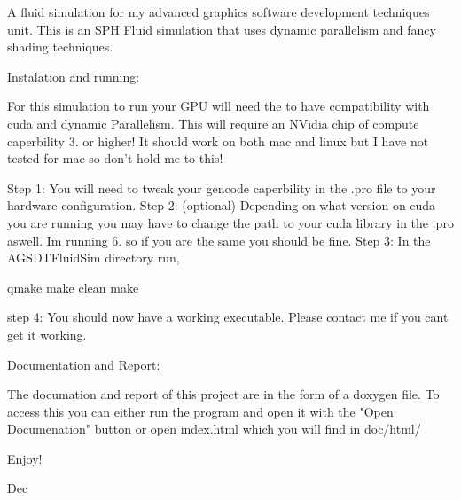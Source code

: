 A fluid simulation for my advanced graphics software development techniques unit. This is an S\-P\-H Fluid simulation that uses dynamic parallelism and fancy shading techniques.

Instalation and running\-:

For this simulation to run your G\-P\-U will need the to have compatibility with cuda and dynamic Parallelism. This will require an N\-Vidia chip of compute caperbility 3. or higher! It should work on both mac and linux but I have not tested for mac so don't hold me to this!

Step 1\-: You will need to tweak your gencode caperbility in the .pro file to your hardware configuration. Step 2\-: (optional) Depending on what version on cuda you are running you may have to change the path to your cuda library in the .pro aswell. Im running 6. so if you are the same you should be fine. Step 3\-: In the A\-G\-S\-D\-T\-Fluid\-Sim directory run, \begin{DoxyVerb}qmake
make clean
make
\end{DoxyVerb}


step 4\-: You should now have a working executable. Please contact me if you cant get it working.

Documentation and Report\-: \begin{DoxyVerb}The documation and report of this project are in the form of a doxygen file. 
To access this you can either run the program and open it with the "Open Documenation"
button or open index.html which you will find in doc/html/ 
\end{DoxyVerb}


Enjoy!

Dec 